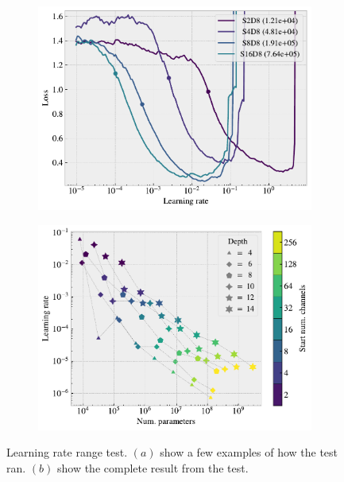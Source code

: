 \begin{figure}[H]
  \centering
  \begin{subfigure}[t]{0.49\textwidth}
      \centering
      \includegraphics[width=\textwidth]{figures/ML/LR_range_specific.pdf}
      \caption{}
  \end{subfigure}
  \hfill
  \begin{subfigure}[t]{0.49\textwidth}
      \centering
      \includegraphics[width=\textwidth]{figures/ML/LR_range_full.pdf}
      \caption{}
  \end{subfigure}
  \hfill
  \caption{Learning rate range test. $(a)$ show a few examples of how the test ran. $(b)$ show the complete result from the test.}
  \label{fig:LR_range}
\end{figure}

